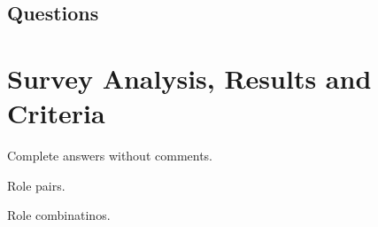 \documentclass[headsepline,titlepage,twoside,12pt,toc=flat,headings=normal]{scrreprt}
\begin{document}
\section{Questions}

\chapter{Survey Analysis, Results and Criteria}\label{ch:introduction}

\clearpage
\begin{sidewaystable}
\caption{Complete answers without comments.}
\label{tab:results}
\tiny
\setlength{\tabcolsep}{2pt}

\end{sidewaystable}
\restoregeometry

\begin{table}
\caption{Role pairs.}
\label{tab:role_pairs}

\end{table}

%

\begin{table}
\caption{Role combinatinos.}
\label{tab:role_combinations}

\end{table}
\end{document}
